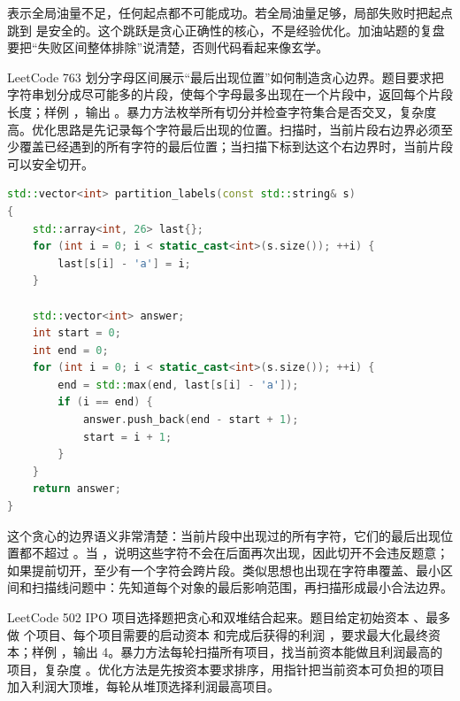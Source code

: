  表示全局油量不足，任何起点都不可能成功。若全局油量足够，局部失败时把起点跳到  是安全的。这个跳跃是贪心正确性的核心，不是经验优化。加油站题的复盘要把“失败区间整体排除”说清楚，否则代码看起来像玄学。

LeetCode 763 划分字母区间展示“最后出现位置”如何制造贪心边界。题目要求把字符串划分成尽可能多的片段，使每个字母最多出现在一个片段中，返回每个片段长度；样例 ，输出 \code{[9,7,8]}。暴力方法枚举所有切分并检查字符集合是否交叉，复杂度高。优化思路是先记录每个字符最后出现的位置。扫描时，当前片段右边界必须至少覆盖已经遇到的所有字符的最后位置；当扫描下标到达这个右边界时，当前片段可以安全切开。

\begin{lstlisting}[language=C++,caption={LeetCode 763 划分字母区间：扫描当前片段最远边界}]
std::vector<int> partition_labels(const std::string& s)
{
    std::array<int, 26> last{};
    for (int i = 0; i < static_cast<int>(s.size()); ++i) {
        last[s[i] - 'a'] = i;
    }

    std::vector<int> answer;
    int start = 0;
    int end = 0;
    for (int i = 0; i < static_cast<int>(s.size()); ++i) {
        end = std::max(end, last[s[i] - 'a']);
        if (i == end) {
            answer.push_back(end - start + 1);
            start = i + 1;
        }
    }
    return answer;
}
\end{lstlisting}

这个贪心的边界语义非常清楚：当前片段中出现过的所有字符，它们的最后出现位置都不超过 。当 ，说明这些字符不会在后面再次出现，因此切开不会违反题意；如果提前切开，至少有一个字符会跨片段。类似思想也出现在字符串覆盖、最小区间和扫描线问题中：先知道每个对象的最后影响范围，再扫描形成最小合法边界。

LeetCode 502 IPO 项目选择题把贪心和双堆结合起来。题目给定初始资本 、最多做  个项目、每个项目需要的启动资本  和完成后获得的利润 ，要求最大化最终资本；样例 ，输出 4。暴力方法每轮扫描所有项目，找当前资本能做且利润最高的项目，复杂度 。优化方法是先按资本要求排序，用指针把当前资本可负担的项目加入利润大顶堆，每轮从堆顶选择利润最高项目。

